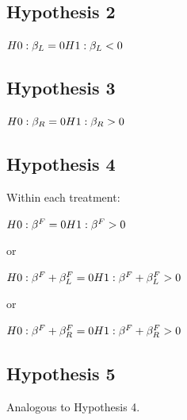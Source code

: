 \subsection{Hypothesis 2}
$H0: \beta_L = 0 \\
H1: \beta_L < 0$

\subsection{Hypothesis 3}
$H0: \beta_R = 0 \\
H1: \beta_R > 0$

\subsection{Hypothesis 4}
Within each treatment:

\noindent $H0: \beta^F = 0 \\
H1: \beta^F > 0$

\noindent or

\noindent $H0: \beta^F + \beta_L^F = 0 \\
H1: \beta^F + \beta_L^F > 0$

\noindent or

\noindent $H0: \beta^F + \beta_R^F = 0 \\
H1: \beta^F + \beta_R^F > 0$

\subsection{Hypothesis 5}
Analogous to Hypothesis 4.

